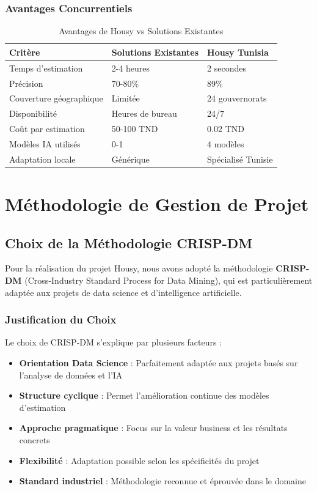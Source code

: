 \subsubsection{Avantages Concurrentiels}

\begin{table}[H]
\centering
\caption{Avantages de Housy vs Solutions Existantes}
\begin{tabular}{|l|l|l|}
\hline
\textbf{Critère} & \textbf{Solutions Existantes} & \textbf{Housy Tunisia} \\
\hline
Temps d'estimation & 2-4 heures & 2 secondes \\
\hline
Précision & 70-80\% & 89\% \\
\hline
Couverture géographique & Limitée & 24 gouvernorats \\
\hline
Disponibilité & Heures de bureau & 24/7 \\
\hline
Coût par estimation & 50-100 TND & 0.02 TND \\
\hline
Modèles IA utilisés & 0-1 & 4 modèles \\
\hline
Adaptation locale & Générique & Spécialisé Tunisie \\
\hline
\end{tabular}
\label{tab:avantages_concurrentiels}
\end{table}

\section{Méthodologie de Gestion de Projet}
\label{sec:methodologie}

\subsection{Choix de la Méthodologie CRISP-DM}
\label{subsec:choix_methodologie}

Pour la réalisation du projet Housy, nous avons adopté la méthodologie \textbf{CRISP-DM} (Cross-Industry Standard Process for Data Mining), qui est particulièrement adaptée aux projets de data science et d'intelligence artificielle.

\subsubsection{Justification du Choix}

Le choix de CRISP-DM s'explique par plusieurs facteurs :

\begin{itemize}
    \item \textbf{Orientation Data Science} : Parfaitement adaptée aux projets basés sur l'analyse de données et l'IA
    \item \textbf{Structure cyclique} : Permet l'amélioration continue des modèles d'estimation
    \item \textbf{Approche pragmatique} : Focus sur la valeur business et les résultats concrets
    \item \textbf{Flexibilité} : Adaptation possible selon les spécificités du projet
    \item \textbf{Standard industriel} : Méthodologie reconnue et éprouvée dans le domaine
\end{itemize}

